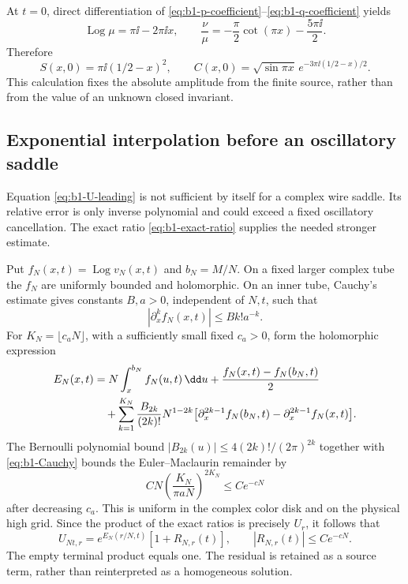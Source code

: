 At $t=0$, direct differentiation of
\eqref{eq:b1-p-coefficient}--\eqref{eq:b1-q-coefficient} yields
\[
 \operatorname{Log}\mu=\pi\ii-2\pi\ii x,
 \qquad \frac\nu\mu=-\frac\pi2\cot(\pi x)-\frac{5\pi\ii}2.
\]
Therefore
\begin{equation}\label{eq:b1-complete-calibration}
 S(x,0)=\pi\ii(1/2-x)^2,\qquad
 C(x,0)=\sqrt{\sin\pi x}\,
                 e^{-3\pi\ii(1/2-x)/2}.
\end{equation}
This calculation fixes the absolute amplitude from the finite source,
rather than from the value of an unknown closed invariant.

\subsection{Exponential interpolation before an oscillatory saddle}

Equation \eqref{eq:b1-U-leading} is not sufficient by itself for a
complex wire saddle. Its relative error is only inverse polynomial and
could exceed a fixed oscillatory cancellation. The exact ratio
\eqref{eq:b1-exact-ratio} supplies the needed stronger estimate.

Put $f_N(x,t)=\operatorname{Log}v_N(x,t)$ and $b_N=M/N$.
On a fixed larger complex tube the $f_N$ are uniformly bounded and
holomorphic. On an inner tube, Cauchy's estimate gives constants
$B,a>0$, independent of $N,t$, such that
\begin{equation}\label{eq:b1-Cauchy}
 |\partial_x^k f_N(x,t)|\le Bk!a^{-k}.
\end{equation}
For $K_N=\lfloor c_aN\rfloor$, with a sufficiently small fixed
$c_a>0$, form the holomorphic expression
\begin{align}
 E_N(x,t)
 &=N\int_x^{b_N}f_N(u,t)\,\dd u
       +\frac{f_N(x,t)-f_N(b_N,t)}2
 \notag\\
 &\quad+\sum_{k=1}^{K_N}
 \frac{B_{2k}}{(2k)!}N^{1-2k}
 \bigl[\partial_x^{2k-1}f_N(b_N,t)
       -\partial_x^{2k-1}f_N(x,t)\bigr].
 \label{eq:b1-optimal-EM}
\end{align}
The Bernoulli polynomial bound
$|B_{2k}(u)|\le4(2k)!/(2\pi)^{2k}$ together with
\eqref{eq:b1-Cauchy} bounds the Euler--Maclaurin remainder by
\[
 C N\left(\frac{K_N}{\pi aN}\right)^{2K_N}
 \le C e^{-cN}
\]
after decreasing $c_a$. This is uniform in the complex color disk and
on the physical high grid. Since the product of the exact ratios is
precisely $U_r$, it follows that
\begin{equation}\label{eq:b1-exponential-grid}
 U_{Nt,r}=e^{E_N(r/N,t)}[1+R_{N,r}(t)],
 \qquad |R_{N,r}(t)|\le C e^{-cN}.
\end{equation}
The empty terminal product equals one. The residual is retained as a
source term, rather than reinterpreted as a homogeneous solution.

